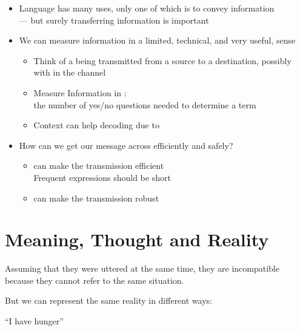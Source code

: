 \documentclass[headrule,footrule]{foils}
\begin{document}
\begin{itemize}
\item Language has many uses, only one of which is to convey information
  \\ --- but surely transferring information is important
\item We can measure information in a limited, technical, and very useful, sense
  \begin{itemize}
  \item Think of a  being transmitted from a source to a
    destination, possibly with  in the channel
  \item Measure Information in : 
    \\ the number of yes/no questions needed to determine a term
  \item Context can help decoding due to 
  \end{itemize}
\item How can we get our message across efficiently and safely?
  \begin{itemize}
  \item {} can make the transmission efficient
    \\ Frequent expressions should be short
  \item {} can make the transmission robust
  \end{itemize}
\end{itemize}

\section{Meaning, Thought and Reality}
\MyLogo{}



\begin{exe}
  \ex {}
  \ex {}
\end{exe}

Assuming that they were uttered at the same time, they are
incompatible because they cannot refer to the same
situation. 

But we can represent the same reality in different ways:

\begin{exe}
  \ex {} ``I have hunger''
  \ex {}
\end{exe}
\end{document}
